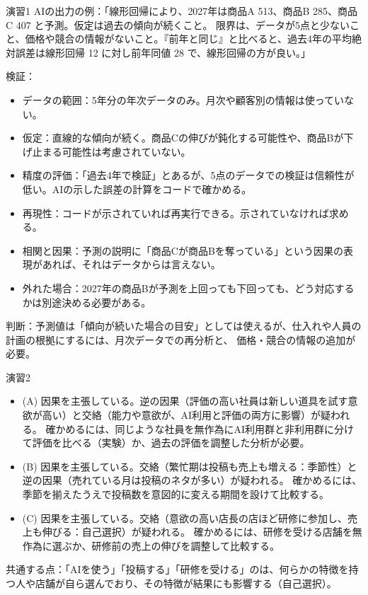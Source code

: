 \begin{answer}{演習1}
AIの出力の例：「線形回帰により、2027年は商品A 513、商品B 285、商品C 407 と予測。仮定は過去の傾向が続くこと。
限界は、データが5点と少ないこと、価格や競合の情報がないこと。『前年と同じ』と比べると、過去4年の平均絶対誤差は線形回帰 12 に対し前年同値 28 で、線形回帰の方が良い。」

検証：
\begin{itemize}
  \item データの範囲：5年分の年次データのみ。月次や顧客別の情報は使っていない。
  \item 仮定：直線的な傾向が続く。商品Cの伸びが鈍化する可能性や、商品Bが下げ止まる可能性は考慮されていない。
  \item 精度の評価：「過去4年で検証」とあるが、5点のデータでの検証は信頼性が低い。AIの示した誤差の計算をコードで確かめる。
  \item 再現性：コードが示されていれば再実行できる。示されていなければ求める。
  \item 相関と因果：予測の説明に「商品Cが商品Bを奪っている」という因果の表現があれば、それはデータからは言えない。
  \item 外れた場合：2027年の商品Bが予測を上回っても下回っても、どう対応するかは別途決める必要がある。
\end{itemize}
判断：予測値は「傾向が続いた場合の目安」としては使えるが、仕入れや人員の計画の根拠にするには、月次データでの再分析と、
価格・競合の情報の追加が必要。
\end{answer}

\begin{answer}{演習2}
\begin{itemize}
  \item (A) 因果を主張している。逆の因果（評価の高い社員は新しい道具を試す意欲が高い）と交絡（能力や意欲が、AI利用と評価の両方に影響）が疑われる。
        確かめるには、同じような社員を無作為にAI利用群と非利用群に分けて評価を比べる（実験）か、過去の評価を調整した分析が必要。
  \item (B) 因果を主張している。交絡（繁忙期は投稿も売上も増える：季節性）と逆の因果（売れている月は投稿のネタが多い）が疑われる。
        確かめるには、季節を揃えたうえで投稿数を意図的に変える期間を設けて比較する。
  \item (C) 因果を主張している。交絡（意欲の高い店長の店ほど研修に参加し、売上も伸びる：自己選択）が疑われる。
        確かめるには、研修を受ける店舗を無作為に選ぶか、研修前の売上の伸びを調整して比較する。
\end{itemize}
共通する点：「AIを使う」「投稿する」「研修を受ける」のは、何らかの特徴を持つ人や店舗が自ら選んでおり、その特徴が結果にも影響する（自己選択）。
\end{answer}

